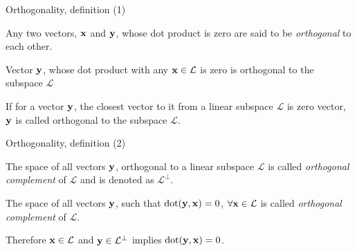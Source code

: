 \documentclass{beamer}
\begin{document}
\begin{frame}{Orthogonality, definition (1)}
	\begin{flushleft}
		
		\begin{definition}
			Any two vectors, $\mathbf{x}$ and $\mathbf{y}$, whose dot product is zero are said to be \emph{orthogonal} to each other.
		\end{definition}
		
		\begin{definition}
			Vector $\mathbf{y}$, whose dot product with any $\mathbf{x} \in \mathcal{L}$ is zero is orthogonal to the subspace $\mathcal{L}$
		\end{definition}
		
		\begin{definition}
			If for a vector $\mathbf{y}$, the closest vector to it from a linear subspace $\mathcal{L}$ is zero vector, $\mathbf{y}$ is called orthogonal to the subspace $\mathcal{L}$.
		\end{definition}
		
		
	\end{flushleft}
\end{frame}


\begin{frame}{Orthogonality, definition (2)}
	\begin{flushleft}
		
		\begin{definition}
			The space of all vectors $\mathbf{y}$, orthogonal to a linear subspace $\mathcal{L}$ is called \emph{orthogonal complement} of $\mathcal{L}$ and is denoted as $\mathcal{L}^\perp$.
		\end{definition}
		
		
		\begin{definition}[equivalent]
			The space of all vectors $\mathbf{y}$, such that $\text{dot}(\mathbf{y}, \mathbf{x}) = 0$, $\forall \mathbf{x} \in \mathcal{L}$ is called \emph{orthogonal complement} of $\mathcal{L}$.
		\end{definition}
		
		Therefore $\mathbf{x} \in \mathcal{L}$ and $\mathbf{y} \in \mathcal{L}^\perp$ implies $\text{dot}(\mathbf{y}, \mathbf{x}) = 0$.
		
	\end{flushleft}
\end{frame}
\end{document}
